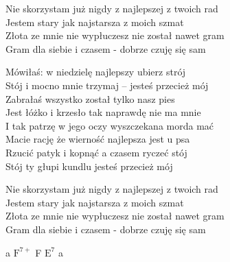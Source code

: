 \begin{text}
Nie skorzystam już nigdy z najlepszej z twoich rad\\
Jestem stary jak najstarsza z moich szmat\\
Złota ze mnie nie wypłuczesz nie został nawet gram\\
Gram dla siebie i czasem - dobrze czuję się sam

Mówiłaś: w niedzielę najlepszy ubierz strój\\
Stój i mocno mnie trzymaj – jesteś przecież mój\\
Zabrałaś wszystko został tylko nasz pies\\
Jest łóżko i krzesło tak naprawdę nie ma mnie\\

I tak patrzę w jego oczy wyszczekana morda mać\\
Macie rację że wierność najlepsza jest u psa\\
Rzucić patyk i kopnąć a czasem ryczeć stój\\
Stój ty głupi kundlu jesteś przecież mój

Nie skorzystam już nigdy z najlepszej z twoich rad\\
Jestem stary jak najstarsza z moich szmat\\
Złota ze mnie nie wypłuczesz nie został nawet gram\\
Gram dla siebie i czasem - dobrze czuję się sam
\end{text}
\begin{chord}
    a $\mathrm{F^{7+}}$ F $\mathrm{E^7}$ a\\

\end{chord}
